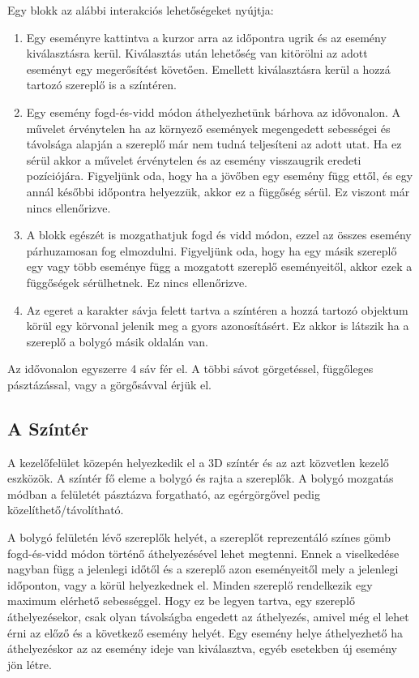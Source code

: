 Egy blokk az alábbi interakciós lehetőségeket nyújtja:
\begin{enumerate}
	\item Egy eseményre kattintva a kurzor arra az időpontra ugrik és az esemény kiválasztásra kerül. Kiválasztás után lehetőség van kitörölni az adott eseményt egy megerősítést követően. Emellett kiválasztásra kerül a hozzá tartozó szereplő is a színtéren.
	\item Egy esemény fogd-és-vidd módon áthelyezhetünk bárhova az idővonalon. A művelet érvénytelen ha az környező események megengedett sebességei és távolsága alapján a szereplő már nem tudná teljesíteni az adott utat. Ha ez sérül akkor a művelet érvénytelen és az esemény visszaugrik eredeti pozíciójára. Figyeljünk oda, hogy ha a jövőben egy esemény függ ettől, és egy annál későbbi időpontra helyezzük, akkor ez a függőség sérül. Ez viszont már nincs ellenőrizve.
	\item A blokk egészét is mozgathatjuk fogd és vidd módon, ezzel az összes esemény párhuzamosan fog elmozdulni. Figyeljünk oda, hogy ha egy másik szereplő egy vagy több eseménye függ a mozgatott szereplő eseményeitől, akkor ezek a függőségek sérülhetnek. Ez nincs ellenőrizve.
	\item Az egeret a karakter sávja felett tartva a színtéren a hozzá tartozó objektum körül egy körvonal jelenik meg a gyors azonosításért. Ez akkor is látszik ha a szereplő a bolygó másik oldalán van.
\end{enumerate}

Az idővonalon egyszerre 4 sáv fér el. A többi sávot görgetéssel, függőleges pásztázással, vagy a görgősávval érjük el.

\subsection{A Színtér} \label{section:ui-scene}

A kezelőfelület közepén helyezkedik el a 3D színtér és az azt közvetlen kezelő eszközök. A színtér fő eleme a bolygó és rajta a szereplők. A bolygó mozgatás módban a felületét pásztázva forgatható, az egérgörgővel pedig közelíthető/távolítható.

A bolygó felületén lévő szereplők helyét, a szereplőt reprezentáló színes gömb fogd-és-vidd módon történő áthelyezésével lehet megtenni. Ennek a viselkedése nagyban függ a jelenlegi időtől és a szereplő azon eseményeitől mely a jelenlegi időponton, vagy a körül helyezkednek el. Minden szereplő rendelkezik egy maximum elérhető sebességgel. Hogy ez be legyen tartva, egy szereplő áthelyezésekor, csak olyan távolságba engedett az áthelyezés, amivel még el lehet érni az előző és a következő esemény helyét. Egy esemény helye áthelyezhető ha áthelyezéskor az az esemény ideje van kiválasztva, egyéb esetekben új esemény jön létre.


